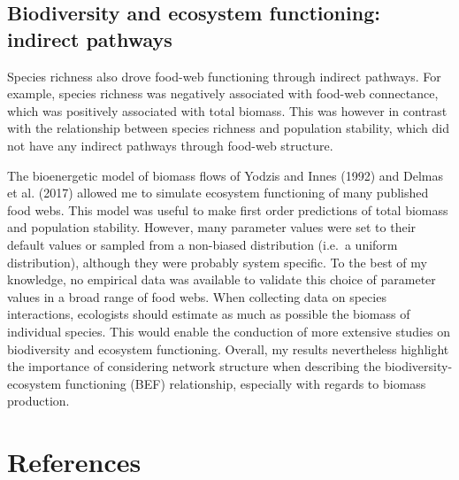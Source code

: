 \documentclass[11pt]{article}
\begin{document}
\hypertarget{biodiversity-and-ecosystem-functioning-indirect-pathways}{%
\subsection{Biodiversity and ecosystem functioning: indirect
pathways}\label{biodiversity-and-ecosystem-functioning-indirect-pathways}}

Species richness also drove food-web functioning through indirect
pathways. For example, species richness was negatively associated with
food-web connectance, which was positively associated with total
biomass. This was however in contrast with the relationship between
species richness and population stability, which did not have any
indirect pathways through food-web structure.

The bioenergetic model of biomass flows of Yodzis and Innes (1992) and
Delmas et al. (2017) allowed me to simulate ecosystem functioning of
many published food webs. This model was useful to make first order
predictions of total biomass and population stability. However, many
parameter values were set to their default values or sampled from a
non-biased distribution (i.e.~a uniform distribution), although they
were probably system specific. To the best of my knowledge, no empirical
data was available to validate this choice of parameter values in a
broad range of food webs. When collecting data on species interactions,
ecologists should estimate as much as possible the biomass of individual
species. This would enable the conduction of more extensive studies on
biodiversity and ecosystem functioning. Overall, my results nevertheless
highlight the importance of considering network structure when
describing the biodiversity-ecosystem functioning (BEF) relationship,
especially with regards to biomass production.

\hypertarget{references}{%
\section*{References}\label{references}}
\end{document}
